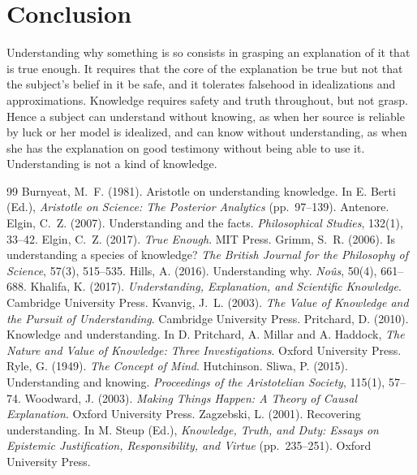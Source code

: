 \documentclass{situationist-preprint}
\begin{document}
\section{Conclusion}

Understanding why something is so consists in grasping an explanation of it that is true enough. It requires that the core of the explanation be true but not that the subject's belief in it be safe, and it tolerates falsehood in idealizations and approximations. Knowledge requires safety and truth throughout, but not grasp. Hence a subject can understand without knowing, as when her source is reliable by luck or her model is idealized, and can know without understanding, as when she has the explanation on good testimony without being able to use it. Understanding is not a kind of knowledge.

\begin{thebibliography}{99}\small
{} Burnyeat, M.~F. (1981). Aristotle on understanding knowledge. In E. Berti (Ed.), \emph{Aristotle on Science: The Posterior Analytics} (pp.~97--139). Antenore.
 Elgin, C.~Z. (2007). Understanding and the facts. \emph{Philosophical Studies}, 132(1), 33--42.
 Elgin, C.~Z. (2017). \emph{True Enough}. MIT Press.
 Grimm, S.~R. (2006). Is understanding a species of knowledge? \emph{The British Journal for the Philosophy of Science}, 57(3), 515--535.
 Hills, A. (2016). Understanding why. \emph{No\^us}, 50(4), 661--688.
 Khalifa, K. (2017). \emph{Understanding, Explanation, and Scientific Knowledge}. Cambridge University Press.
 Kvanvig, J.~L. (2003). \emph{The Value of Knowledge and the Pursuit of Understanding}. Cambridge University Press.
 Pritchard, D. (2010). Knowledge and understanding. In D. Pritchard, A. Millar and A. Haddock, \emph{The Nature and Value of Knowledge: Three Investigations}. Oxford University Press.
 Ryle, G. (1949). \emph{The Concept of Mind}. Hutchinson.
 Sliwa, P. (2015). Understanding and knowing. \emph{Proceedings of the Aristotelian Society}, 115(1), 57--74.
 Woodward, J. (2003). \emph{Making Things Happen: A Theory of Causal Explanation}. Oxford University Press.
 Zagzebski, L. (2001). Recovering understanding. In M. Steup (Ed.), \emph{Knowledge, Truth, and Duty: Essays on Epistemic Justification, Responsibility, and Virtue} (pp.~235--251). Oxford University Press.
\end{thebibliography}
\end{document}
